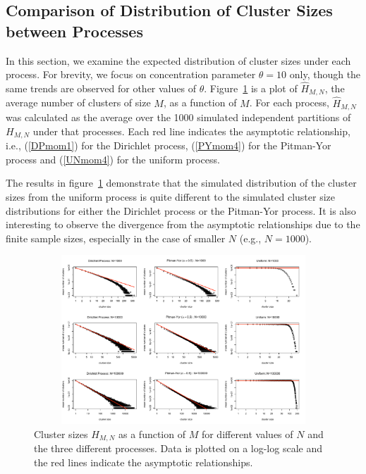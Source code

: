 \documentclass{article}
\begin{document}
\subsection{Comparison of Distribution of Cluster Sizes between
  Processes}

In this section, we examine the expected distribution of cluster sizes
under each process. For brevity, we focus on concentration parameter
$\theta = 10$ only, though the same trends are observed for other
values of $\theta$. Figure~\ref{simclustersizes} is a plot of
$\hat{H}_{M,N}$, the average number of clusters of size $M$, as a
function of $M$. For each process, $\hat{H}_{M,N}$ was calculated as
the average over the 1000 simulated independent partitions of
$H_{M,N}$ under that processes. Each red line indicates the asymptotic
relationship, i.e., (\ref{DPmom1}) for the Dirichlet process,
(\ref{PYmom4}) for the Pitman-Yor process and (\ref{UNmom4}) for the
uniform process.

The results in figure~\ref{simclustersizes} demonstrate that the
simulated distribution of the cluster sizes from the uniform process
is quite different to the simulated cluster size distributions for
either the Dirichlet process or the Pitman-Yor process.  It is also
interesting to observe the divergence from the asymptotic
relationships due to the finite sample sizes, especially in the case
of smaller $N$ (e.g., $N = 1000$).

\begin{figure}[t]
\centering
\includegraphics[width=5in,height=2.5in]{figures/fig_clustersizes.pdf}
\caption{Cluster sizes $H_{M,N}$ as a function of $M$ for different
  values of $N$ and the three different processes.  Data is plotted on a log-log
  scale and the red lines indicate the asymptotic
  relationships.}\label{simclustersizes}
\vspace{-0.4cm}
\end{figure}
\end{document}
